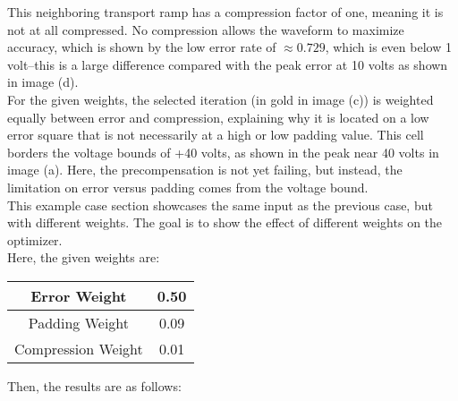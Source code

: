\documentclass[11pt, a4paper]{article}
\theoremstyle{definition}
\numberwithin{equation}{section}
\begin{document}
This neighboring transport ramp has a compression factor of one, meaning it is not at all compressed. No compression allows the waveform to maximize accuracy, which is shown by the low error rate of $\approx 0.729$, which is even below 1 volt--this is a large difference compared with the peak error at 10 volts as shown in image (d).
\\
For the given weights, the selected iteration (in gold in image (c)) is weighted equally between error and compression, explaining why it is located on a low error square that is not necessarily at a high or low padding value. This cell borders the voltage bounds of +40 volts, as shown in the peak near 40 volts in image (a). Here, the precompensation is not yet failing, but instead, the limitation on error versus padding comes from the voltage bound. 
\\
This example case section showcases the same input as the previous case, but with different weights. The goal is to show the effect of different weights on the optimizer.
\\
Here, the given weights are:

\begin{center}
\begin{tabular}{ | c | c | } 
  \hline
   Error Weight & 0.50 \\ 
  \hline
  Padding Weight & 0.09 \\ 
  \hline
  Compression Weight & 0.01 \\ 
  \hline
\end{tabular}
\end{center}

Then, the results are as follows:
\end{document}
